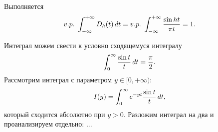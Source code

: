 

\begin{to_lem}
    Выполняется
    \begin{equation*}
        v.p.\ \int_{-\infty}^{+\infty}  D_h(t) \d t = v.p. \ \int_{-\infty}^{+\infty}  \frac{\sin ht}{\pi t} = 1.
    \end{equation*}
\end{to_lem}

\begin{uproof}
Интеграл можем свести к условно сходящемуся интегралу
\begin{equation*}
    \int_{0}^{\infty}  \frac{\sin t}{t} \, d t =\frac{\pi}{2}.
\end{equation*}
Рассмотрим интеграл с параметром $y \in [0, +\infty)$:
\begin{equation*}
    I(y) = \int_{0}^{\infty} e^{-yt} \frac{\sin t}{t} \, d t,
\end{equation*}
который сходится абсолютно при $y > 0$. Разложим интеграл на два и проанализируем отдельно:
...
\end{uproof}



